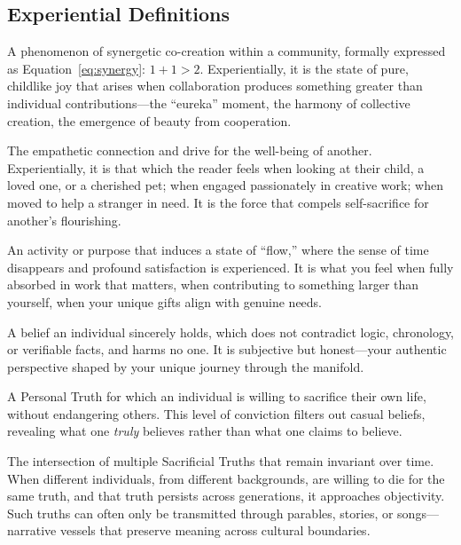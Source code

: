 \documentclass[11pt,a4paper]{article}
\begin{document}
\begin{small}
\subsection*{Experiential Definitions}

\begin{description}[style=nextline, leftmargin=0pt, labelindent=0pt]
    \item[\textbf{God}] A phenomenon of synergetic co-creation within a community, formally expressed as Equation~\eqref{eq:synergy}: $1+1 > 2$. Experientially, it is the state of pure, childlike joy that arises when collaboration produces something greater than individual contributions—the ``eureka'' moment, the harmony of collective creation, the emergence of beauty from cooperation.

    \item[\textbf{Love}] The empathetic connection and drive for the well-being of another. Experientially, it is that which the reader feels when looking at their child, a loved one, or a cherished pet; when engaged passionately in creative work; when moved to help a stranger in need. It is the force that compels self-sacrifice for another's flourishing.

    \item[\textbf{Meaning}] An activity or purpose that induces a state of ``flow,'' where the sense of time disappears and profound satisfaction is experienced. It is what you feel when fully absorbed in work that matters, when contributing to something larger than yourself, when your unique gifts align with genuine needs.

    \item[\textbf{Personal Truth (\textit{Pravda})}] A belief an individual sincerely holds, which does not contradict logic, chronology, or verifiable facts, and harms no one. It is subjective but honest—your authentic perspective shaped by your unique journey through the manifold.

    \item[\textbf{Sacrificial Truth (\textit{Istina-Cheloveka})}] A Personal Truth for which an individual is willing to sacrifice their own life, without endangering others. This level of conviction filters out casual beliefs, revealing what one \textit{truly} believes rather than what one claims to believe.

    \item[\textbf{Objective Truth (\textit{Istina})}] The intersection of multiple Sacrificial Truths that remain invariant over time. When different individuals, from different backgrounds, are willing to die for the same truth, and that truth persists across generations, it approaches objectivity. Such truths can often only be transmitted through parables, stories, or songs—narrative vessels that preserve meaning across cultural boundaries.


\end{description}
\end{small}
\end{document}
